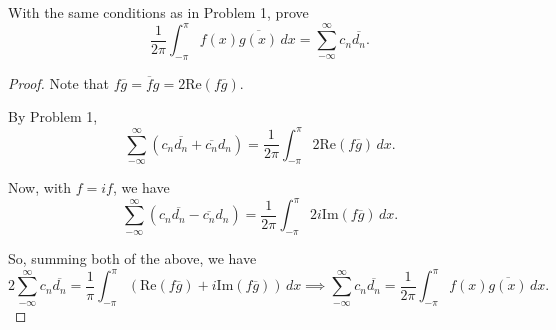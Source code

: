 \documentclass[../hw6]{subfiles}
\begin{document}
\begin{problem}
With the same conditions as in Problem 1, prove \[
	\frac{1}{2\pi}\int_{-\pi}^{\pi} f(x)\overline{g(x)} \,dx = \sum_{-\infty}^{\infty} c_n \overline{d_n}
	.\]
\end{problem}
\begin{proof}
	Note that $f\overline{g}=\overline{f}g = 2\text{Re}(f\overline{g})$.

	By Problem 1, \[
		\sum_{-\infty}^{\infty} (c_n \overline{d_n} + \overline{c_n} d_n) = \frac{1}{2\pi}\int_{-\pi}^{\pi} 2\text{Re}(f\overline{g}) \,dx
		.\]

	Now, with $f=if$, we have \[
		\sum_{-\infty}^{\infty} (c_n \overline{d_n}- \overline{c_n}d_n) = \frac{1}{2\pi}\int_{-\pi}^{\pi} 2i \text{Im}(f\overline{g}) \,dx
		.\]

	So, summing both of the above, we have \[
		2 \sum_{-\infty}^{\infty} c_n \overline{d_n} = \frac{1}{\pi} \int_{-\pi}^{\pi} (\text{Re}(f\overline{g})+i\text{Im}(f\overline{g})) \,dx \implies \sum_{-\infty}^{\infty} c_n \overline{d_n} = \frac{1}{2\pi}\int_{-\pi}^{\pi} f(x)\overline{g(x)} \,dx
		.\]
\end{proof}
\end{document}
